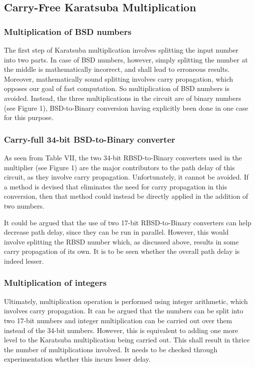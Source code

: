 \documentclass[conference]{IEEEtran_IBSS}
\begin{document}
\subsection{Carry-Free Karatsuba Multiplication}

\subsubsection{Multiplication of BSD numbers}

The first step of Karatsuba multiplication involves splitting the input number into two parts. In case of BSD numbers, however, simply splitting the number at the middle is mathematically incorrect, and shall lead to erroneous results. Moreover, mathematically sound splitting involves carry propagation, which opposes our goal of fast computation. So multiplication of BSD numbers is avoided. Instead, the three multiplications in the circuit are of binary numbers (see Figure 1), BSD-to-Binary conversion having explicitly been done in one case for this purpose.

\subsubsection{Carry-full 34-bit BSD-to-Binary converter}

As seen from Table VII, the two 34-bit RBSD-to-Binary converters used in the multiplier (see Figure 1) are the major contributors to the path delay of this circuit, as they involve carry propagation. Unfortunately, it cannot be avoided. If a method is devised that eliminates the need for carry propagation in this conversion, then that method could instead be directly applied in the addition of two numbers.

It could be argued that the use of two 17-bit RBSD-to-Binary converters can help decrease path delay, since they can be run in parallel. However, this would involve splitting the RBSD number which, as discussed above, results in some carry propagation of its own. It is to be seen whether the overall path delay is indeed lesser.

\subsubsection{Multiplication of integers}

Ultimately, multiplication operation is performed using integer arithmetic, which involves carry propagation. It can be argued that the numbers can be split into two 17-bit numbers and integer multiplication can be carried out over them instead of the 34-bit numbers. However, this is equivalent to adding one more level to the Karatsuba multiplication being carried out. This shall result in thrice the number of multiplications involved. It needs to be checked through experimentation whether this incurs lesser delay.
\end{document}
